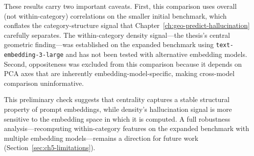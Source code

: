 These results carry two important caveats. First, this comparison uses overall (not within-category) correlations on the smaller initial benchmark, which conflates the category-structure signal that Chapter~\ref{ch:geo-predict-hallucination} carefully separates. The within-category density signal---the thesis's central geometric finding---was established on the expanded benchmark using \texttt{text-embedding-3-large} and has not been tested with alternative embedding models. Second, oppositeness was excluded from this comparison because it depends on PCA axes that are inherently embedding-model-specific, making cross-model comparison uninformative.

This preliminary check suggests that centrality captures a stable structural property of prompt embeddings, while density's hallucination signal is more sensitive to the embedding space in which it is computed. A full robustness analysis---recomputing within-category features on the expanded benchmark with multiple embedding models---remains a direction for future work (Section~\ref{sec:ch5-limitations}).
